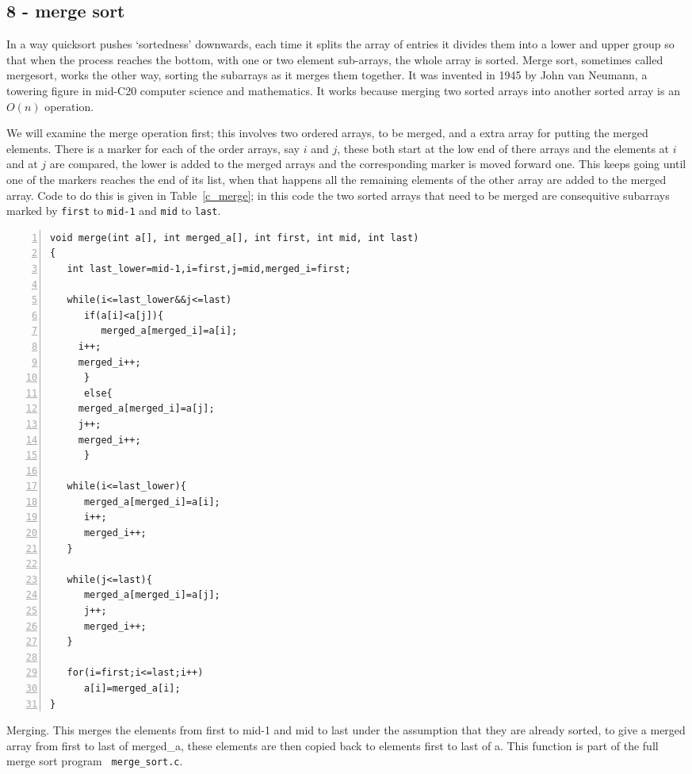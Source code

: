\documentclass[11pt,a4paper]{scrartcl}
\begin{document}
\subsection*{8 - merge sort}

In a way quicksort pushes \lq{}sortedness\rq{} downwards, each time it
splits the array of entries it divides them into a lower and upper
group so that when the process reaches the bottom, with one or two
element sub-arrays, the whole array is sorted. Merge sort, sometimes
called mergesort, works the other way, sorting the subarrays as it
merges them together. It was invented in 1945 by John van Neumann, a towering
figure in mid-C20 computer science and mathematics. It works because
merging two sorted arrays into another sorted array is an $O(n)$
operation.

We will examine the merge operation first; this involves two ordered
arrays, to be merged, and a extra array for putting the merged
elements. There is a marker for each of the order arrays, say $i$ and
$j$, these both start at the low end of there arrays and the elements
at $i$ and at $j$ are compared, the lower is added to the merged
arrays and the corresponding marker is moved forward one. This keeps
going until one of the markers reaches the end of its list, when that
happens all the remaining elements of the other array are added to the
merged array. Code to do this is given in Table~\ref{c_merge}; in this
code the two sorted arrays that need to be merged are consequitive
subarrays marked by \texttt{first} to \texttt{mid-1} and \texttt{mid} to \texttt{last}.


\begin{table}
\begin{lstlisting}[numbers=left]
void merge(int a[], int merged_a[], int first, int mid, int last)
{
   int last_lower=mid-1,i=first,j=mid,merged_i=first;

   while(i<=last_lower&&j<=last)
      if(a[i]<a[j]){
         merged_a[merged_i]=a[i];
	 i++;
	 merged_i++;
      }
      else{
	 merged_a[merged_i]=a[j];
	 j++;
	 merged_i++;
      }

   while(i<=last_lower){
      merged_a[merged_i]=a[i];
      i++;
      merged_i++;
   }

   while(j<=last){
      merged_a[merged_i]=a[j];
      j++;
      merged_i++;
   }

   for(i=first;i<=last;i++)
      a[i]=merged_a[i];
}
\end{lstlisting}
\caption{Merging. This merges the elements from first to mid-1 and mid
  to last under the assumption that they are already sorted, to give a
  merged array from first to last of merged\_a, these elements are
  then copied back to elements first to last of a. This function is
  part of the full merge sort program {\tt
    merge\_sort.c}. \label{c_merge}}
\end{table}
\end{document}

